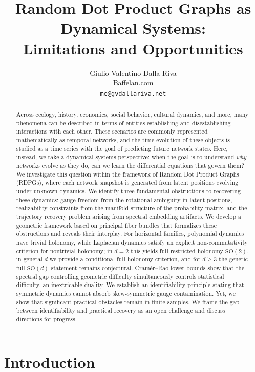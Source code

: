 \documentclass{article}
\title{Random Dot Product Graphs as Dynamical Systems: \\
  Limitations and Opportunities}
\author{Giulio Valentino Dalla Riva \\
  Baffelan.com \\
  \texttt{me@gvdallariva.net}}
\theoremstyle{plain}
\theoremstyle{definition}
\theoremstyle{remark}
\begin{document}
\maketitle

\begin{abstract}
Across ecology, history, economics, social behavior, cultural dynamics, and more, many phenomena can be described in terms of entities establishing and disestablishing interactions with each other. These scenarios are commonly represented mathematically as temporal networks, and the time evolution of these objects is studied as a time series with the goal of predicting future network states. Here, instead, we take a dynamical systems perspective: when the goal is to understand \emph{why} networks evolve as they do, can we learn the differential equations that govern them?
We investigate this question within the framework of Random Dot Product Graphs (RDPGs), where each network snapshot is generated from latent positions evolving under unknown dynamics. We identify three fundamental obstructions to recovering these dynamics: gauge freedom from the rotational ambiguity in latent positions, realizability constraints from the manifold structure of the probability matrix, and the trajectory recovery problem arising from spectral embedding artifacts.
We develop a geometric framework based on principal fiber bundles that formalizes these obstructions and reveals their interplay. For horizontal families, polynomial dynamics have trivial holonomy, while Laplacian dynamics satisfy an explicit non-commutativity criterion for nontrivial holonomy; in $d = 2$ this yields full restricted holonomy $\mathrm{SO}(2)$, in general $d$ we provide a conditional full-holonomy criterion, and for $d \ge 3$ the generic full $\mathrm{SO}(d)$ statement remains conjectural. Cram\'er--Rao lower bounds show that the spectral gap controlling geometric difficulty simultaneously controls statistical difficulty, an inextricable duality.
We establish an identifiability principle stating that symmetric dynamics cannot absorb skew-symmetric gauge contamination. Yet, we show that significant practical obstacles remain in finite samples. We frame the gap between identifiability and practical recovery as an open challenge and discuss directions for progress.
\end{abstract}


\section{Introduction}\label{sec:intro}
\end{document}
